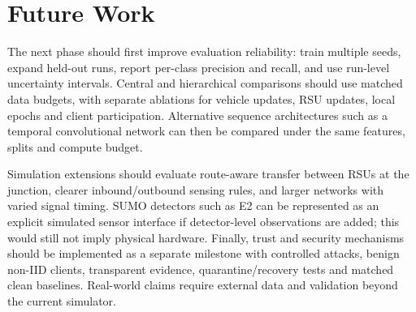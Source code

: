 \section{Future Work}
The next phase should first improve evaluation reliability: train multiple seeds, expand held-out runs, report per-class precision and recall, and use run-level uncertainty intervals. Central and hierarchical comparisons should use matched data budgets, with separate ablations for vehicle updates, RSU updates, local epochs and client participation. Alternative sequence architectures such as a temporal convolutional network can then be compared under the same features, splits and compute budget.

Simulation extensions should evaluate route-aware transfer between RSUs at the junction, clearer inbound/outbound sensing rules, and larger networks with varied signal timing. SUMO detectors such as E2 can be represented as an explicit simulated sensor interface if detector-level observations are added; this would still not imply physical hardware. Finally, trust and security mechanisms should be implemented as a separate milestone with controlled attacks, benign non-IID clients, transparent evidence, quarantine/recovery tests and matched clean baselines. Real-world claims require external data and validation beyond the current simulator.
